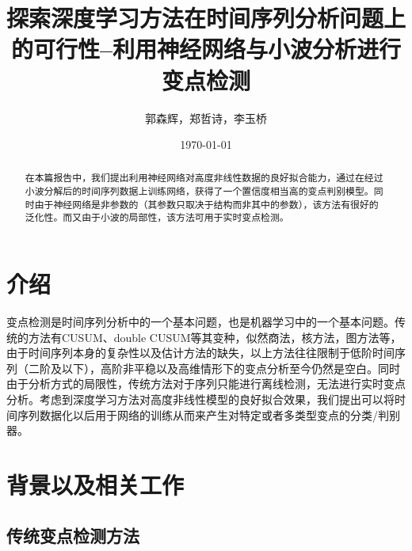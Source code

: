 \documentclass{ctexart}
\title{探索深度学习方法在时间序列分析问题上的可行性--利用神经网络与小波分析进行变点检测}
\author{郭森辉，郑哲诗，李玉桥}
\date{\today}
\begin{document}
\maketitle

\begin{abstract}
在本篇报告中，我们提出利用神经网络对高度非线性数据的良好拟合能力，通过在经过小波分解后的时间序列数据上训练网络，获得了一个置信度相当高的变点判别模型。同时由于神经网络是非参数的（其参数只取决于结构而非其中的参数），该方法有很好的泛化性。而又由于小波的局部性，该方法可用于实时变点检测。
\end{abstract}

\section{介绍}
\label{sec:introduction}

变点检测是时间序列分析中的一个基本问题，也是机器学习中的一个基本问题。传统的方法有CUSUM、double CUSUM等其变种，似然商法，核方法，图方法等，由于时间序列本身的复杂性以及估计方法的缺失，以上方法往往限制于低阶时间序列（二阶及以下），高阶非平稳以及高维情形下的变点分析至今仍然是空白。同时由于分析方式的局限性，传统方法对于序列只能进行离线检测，无法进行实时变点分析。考虑到深度学习方法对高度非线性模型的良好拟合效果，我们提出可以将时间序列数据化以后用于网络的训练从而来产生对特定或者多类型变点的分类/判别器。

\section{背景以及相关工作}
\label{sec:theory}

\subsection{传统变点检测方法}
\end{document}
